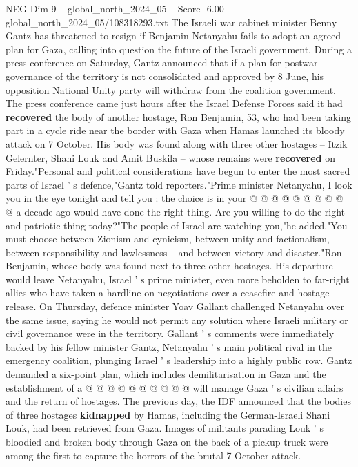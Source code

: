 \begin{textsample}{NEG Dim 9 – global\_north\_2024\_05 – Score -6.00 – global\_north\_2024\_05/108318293.txt}  \label{ex:f9_neg_238}
The Israeli war cabinet minister Benny Gantz has threatened to resign if Benjamin Netanyahu fails to adopt an agreed plan for Gaza, calling into question the future of the Israeli government.
During a press conference on Saturday, Gantz announced that if a plan for postwar governance of the territory is not consolidated and approved by 8 June, his opposition National Unity party will withdraw from the coalition government.
The press conference came just hours after the Israel Defense Forces said it had \textbf{recovered} the body of another hostage, Ron Benjamin, 53, who had been taking part in a cycle ride near the border with Gaza when Hamas launched its bloody attack on 7 October.
His body was found along with three other hostages -- Itzik Gelernter, Shani Louk and Amit Buskila -- whose remains were \textbf{recovered} on Friday."Personal and political considerations have begun to enter the most sacred parts of Israel ' s defence,"Gantz told reporters."Prime minister Netanyahu, I look you in the eye tonight and tell you : the choice is in your @ @ @ @ @ @ @ @ @ @ a decade ago would have done the right thing.
Are you willing to do the right and patriotic thing today?"The people of Israel are watching you,"he added."You must choose between Zionism and cynicism, between unity and factionalism, between responsibility and lawlessness -- and between victory and disaster."Ron Benjamin, whose body was found next to three other hostages.
His departure would leave Netanyahu, Israel ' s prime minister, even more beholden to far-right allies who have taken a hardline on negotiations over a ceasefire and hostage release.
On Thursday, defence minister Yoav Gallant challenged Netanyahu over the same issue, saying he would not permit any solution where Israeli military or civil governance were in the territory.
Gallant ' s comments were immediately backed by his fellow minister Gantz, Netanyahu ' s main political rival in the emergency coalition, plunging Israel ' s leadership into a highly public row.
Gantz demanded a six-point plan, which includes demilitarisation in Gaza and the establishment of a @ @ @ @ @ @ @ @ @ @ will manage Gaza ' s civilian affairs and the return of hostages.
The previous day, the IDF announced that the bodies of three hostages \textbf{kidnapped} by Hamas, including the German-Israeli Shani Louk, had been retrieved from Gaza.
Images of militants parading Louk ' s bloodied and broken body through Gaza on the back of a pickup truck were among the first to capture the horrors of the brutal 7 October attack.

\end{textsample}
